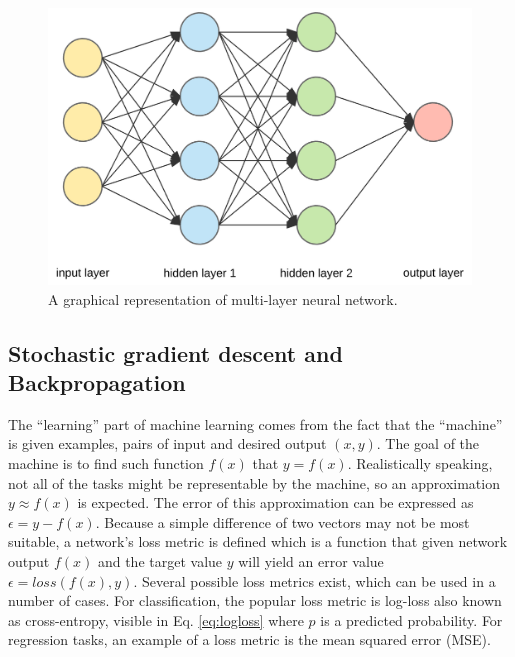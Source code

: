 \begin{figure}
  \centering
  \includegraphics[width=0.5\linewidth]{figures/chapter3/1_3fA77_mLNiJTSgZFhYnU0Q.png}
  \caption[multilayer ann]{A graphical representation of multi-layer neural network\footnotemark. }
  \label{fig:multilayer_neuron}
\end{figure}

\subsection{Stochastic gradient descent and Backpropagation}

The ``learning'' part of machine learning comes from the fact that the ``machine'' is given examples, pairs of input and desired output $(x,y)$.
The goal of the machine is to find such function $f(x)$ that $y=f(x)$.
Realistically speaking, not all of the tasks might be representable by the machine, so an approximation $y \approx f(x)$ is expected.
The error of this approximation can be expressed as $\epsilon = y - f(x)$.
Because a simple difference of two vectors may not be most suitable, a network's loss metric is defined which is a function that given network output $f(x)$ and the target value $y$ will yield an error value $\epsilon = loss(f(x), y)$.
Several possible loss metrics exist, which can be used in a number of cases.
For classification, the popular loss metric is log-loss also known as cross-entropy, visible in Eq. \ref{eq:logloss} where $p$ is a predicted probability.
For regression tasks, an example of a loss metric is the mean squared error (MSE).


